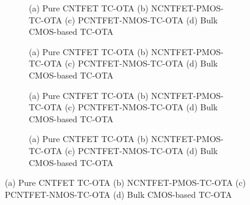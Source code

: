 \begin{figure}[htbp]
  \centering
  \begin{subfigure}[b]{0.23\linewidth}
    \centering
    \caption{(a) Pure CNTFET TC-OTA (b) NCNTFET-PMOS-TC-OTA (c) PCNTFET-NMOS-TC-OTA (d) Bulk CMOS-based TC-OTA}

  \end{subfigure}
  \hfill
  \begin{subfigure}[b]{0.23\linewidth}
    \centering
    \caption{(a) Pure CNTFET TC-OTA (b) NCNTFET-PMOS-TC-OTA (c) PCNTFET-NMOS-TC-OTA (d) Bulk CMOS-based TC-OTA}

  \end{subfigure}
  \hfill
  \begin{subfigure}[b]{0.23\linewidth}
    \centering
    \caption{(a) Pure CNTFET TC-OTA (b) NCNTFET-PMOS-TC-OTA (c) PCNTFET-NMOS-TC-OTA (d) Bulk CMOS-based TC-OTA}

  \end{subfigure}
  \hfill
  \begin{subfigure}[b]{0.23\linewidth}
    \centering
    \caption{(a) Pure CNTFET TC-OTA (b) NCNTFET-PMOS-TC-OTA (c) PCNTFET-NMOS-TC-OTA (d) Bulk CMOS-based TC-OTA}

  \end{subfigure}
  \caption{(a) Pure CNTFET TC-OTA (b) NCNTFET-PMOS-TC-OTA (c) PCNTFET-NMOS-TC-OTA (d) Bulk CMOS-based TC-OTA}

  \label{fig:group_r0i95}
\end{figure}

